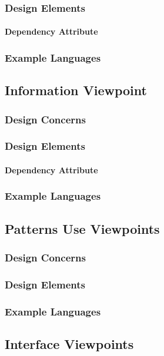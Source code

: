 \documentclass[letterpaper,10pt,titlepage,draftclsnofoot,onecolumn,onesided] {IEEEtran}
\begin{document}
\subsubsection{Design Elements}
\paragraph{Dependency Attribute}
\subsubsection{Example Languages}

\subsection{Information Viewpoint}
\subsubsection{Design Concerns}
\subsubsection{Design Elements}
\paragraph{Dependency Attribute}
\subsubsection{Example Languages}

\subsection{Patterns Use Viewpoints}
\subsubsection{Design Concerns}
\subsubsection{Design Elements}
\subsubsection{Example Languages}

\subsection{Interface Viewpoints}
\end{document}
